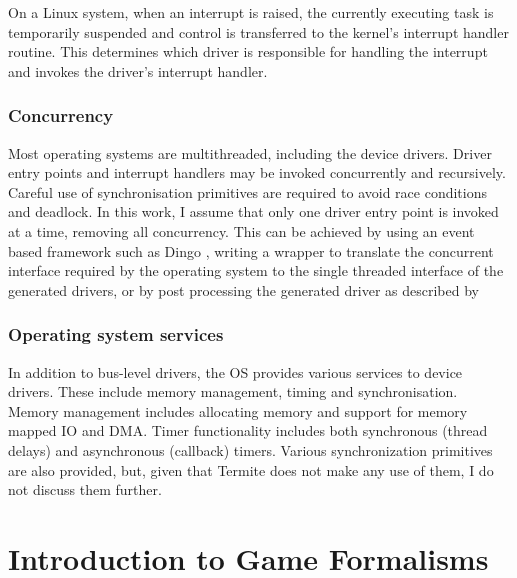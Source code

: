 On a Linux system, when an interrupt is raised, the currently executing task is temporarily suspended and control is transferred to the kernel's interrupt handler routine. This determines which driver is responsible for handling the interrupt and invokes the driver's interrupt handler.

\subsubsection{Concurrency}

Most operating systems are multithreaded, including the device drivers. Driver entry points and interrupt handlers may be invoked concurrently and recursively. Careful use of synchronisation primitives are required to avoid race conditions and deadlock. In this work, I assume that only one driver entry point is invoked at a time, removing all concurrency. This can be achieved by using an event based framework such as Dingo \cite{Ryzhyk_CKH_09}, writing a wrapper to translate the concurrent interface required by the operating system to the single threaded interface of the generated drivers, or by post processing the generated driver as described by \cite{Cerny_HRRT_13, sched-cav, scheduling-cav15}

\subsubsection{Operating system services}

In addition to bus-level drivers, the OS provides various services to device drivers. These include memory management, timing and synchronisation. Memory management includes allocating memory and support for memory mapped IO and DMA. Timer functionality includes both synchronous (thread delays) and asynchronous (callback) timers. Various synchronization primitives are also provided, but, given that Termite does not make any use of them, I do not discuss them further.

\section{Introduction to Game Formalisms}


